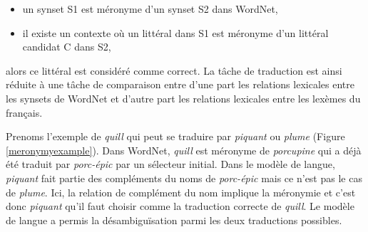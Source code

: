 \begin{itemize}
    \item un synset S1 est méronyme d'un synset S2 dans WordNet,
    \item il existe un contexte où un littéral dans S1 est méronyme d'un littéral candidat C dans S2,
\end{itemize}
alors ce littéral est considéré comme correct. La tâche de traduction est ainsi réduite à une tâche de comparaison entre d'une part les relations lexicales entre les synsets de WordNet et d'autre part les relations lexicales entre les lexèmes du français.

Prenoms l'exemple de \textit{quill} qui peut se traduire par \textit{piquant} ou \textit{plume} (Figure \ref{meronymyexample}). Dans WordNet, \textit{quill} est méronyme de \textit{porcupine} qui a déjà été traduit par \textit{porc-épic} par un sélecteur initial. Dans le modèle de langue, \textit{piquant} fait partie des compléments du noms de \textit{porc-épic} mais ce n'est pas le cas de \textit{plume}. Ici, la relation de complément du nom implique la méronymie et c'est donc \textit{piquant} qu'il faut choisir comme la traduction correcte de \textit{quill}. Le modèle de langue a permis la désambiguïsation parmi les deux traductions possibles.

